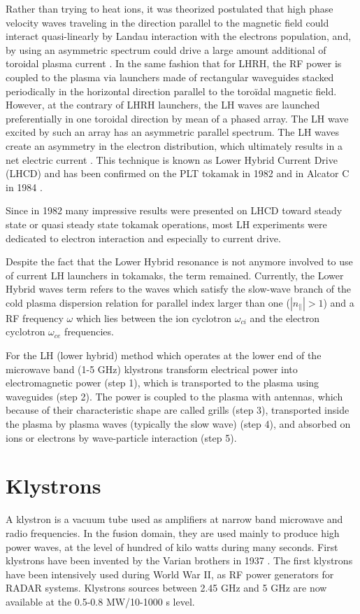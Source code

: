 Rather than trying to heat ions, it was theorized postulated that high phase velocity waves traveling in the direction parallel to the magnetic field could interact quasi-linearly by Landau interaction with the electrons population, and, by using an asymmetric spectrum could drive a large amount additional of toroidal plasma current \cite{Fisch1978}. In the same fashion that for LHRH, the RF power is coupled to the plasma via launchers made of rectangular waveguides stacked periodically in the horizontal direction parallel to the toroïdal magnetic field. However, at the contrary of LHRH launchers, the LH waves are launched preferentially in one toroidal direction by mean of a phased array. The LH wave excited by such an array has an asymmetric parallel spectrum. The LH waves create an asymmetry in the electron distribution, which ultimately results in a net electric current \cite{Fisch1987a}. This technique is known as Lower Hybrid Current Drive (LHCD) and has been confirmed on the PLT tokamak in 1982 \cite{Bernabei1982, Motley1985, Jobes1985} and in Alcator C in 1984 \cite{Porkolab1984}. 

Since in 1982 many impressive results were presented on LHCD\cite{Hooke1982, Porkolab1982, Tonon1982} toward steady state or quasi steady state tokamak operations, most LH experiments were dedicated to electron interaction and especially to current drive. 

Despite the fact that the Lower Hybrid resonance is not anymore involved to use of current LH launchers in tokamaks, the term remained. Currently, the Lower Hybrid waves term refers to the waves which satisfy the slow-wave branch of the cold plasma dispersion relation for parallel index larger than one ($|n_{\parallel}|>1$) and a RF frequency $\omega$ which lies between the ion cyclotron $\omega_{ci}$ and the electron cyclotron $\omega_{ce}$ frequencies. 

For the LH (lower hybrid) method which operates at the lower end of the microwave band (1-5 GHz) klystrons transform electrical power into electromagnetic power (step 1), which is transported to the plasma using waveguides (step 2). The power is coupled to the plasma with antennas, which because of their characteristic shape are called grills (step 3), transported inside the plasma by plasma waves (typically the slow wave) (step 4), and absorbed on ions or electrons by wave-particle interaction (step 5).

\section{Klystrons}
A klystron is a vacuum tube used as amplifiers at narrow band microwave and radio frequencies. In the fusion domain, they are used mainly to produce high power waves, at the level of hundred of kilo watts during many seconds. First klystrons have been invented by the Varian brothers in 1937 \cite{Pond2008}. The first klystrons have been intensively used during World War II, as RF power generators for RADAR systems. Klystrons sources between 2.45 GHz and 5 GHz are now available at the 0.5-0.8 MW/10-1000 s level\cite{Pond2008}. 

